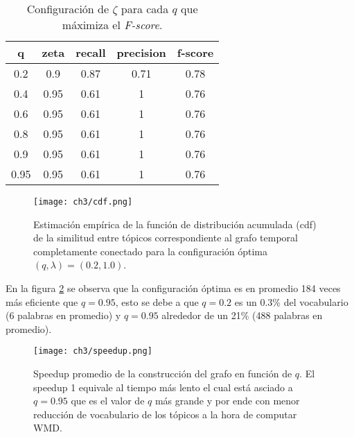 \documentclass[letterpaper,12pt,oneside]{book} %
\begin{document}
\begin{table}[H]
    \begin{tabular}{|c|c|c|c|c|}
    \hline
    \textbf{q} & \textbf{zeta} & \textbf{recall} & \textbf{precision} & \textbf{f-score} \\ \hline
    0.2        & 0.9           & 0.87            & 0.71               & 0.78             \\ \hline
    0.4        & 0.95          & 0.61            & 1                  & 0.76             \\ \hline
    0.6        & 0.95          & 0.61            & 1                  & 0.76             \\ \hline
    0.8        & 0.95          & 0.61            & 1                  & 0.76             \\ \hline
    0.9        & 0.95          & 0.61            & 1                  & 0.76             \\ \hline
    0.95       & 0.95          & 0.61            & 1                  & 0.76             \\ \hline
    \end{tabular}
    \caption{Configuración de $\zeta$ para cada $q$ que máximiza el \textit{F-score}.}
    \label{table:f_score}
\end{table}

\begin{figure}
    \centering
    \texttt{[image: ch3/cdf.png]}
    \caption{Estimación empírica de la función de distribución acumulada (cdf) de la similitud entre tópicos correspondiente al grafo temporal completamente conectado para la configuración óptima $(q, \lambda)=(0.2, 1.0)$.}
    \label{img:cdf}
\end{figure}

En la figura \ref{img:speedup} se observa que la configuración óptima es en promedio 184 veces más eficiente que $q=0.95$, esto se debe a que $q=0.2$ es un 0.3\% del vocabulario (6 palabras en promedio) y $q=0.95$ alrededor de un 21\% (488 palabras en promedio).


\begin{figure}
    \centering
    \texttt{[image: ch3/speedup.png]}
    \caption{Speedup promedio de la construcción del grafo en función de $q$. El speedup 1 equivale al tiempo más lento el cual está asciado a $q=0.95$ que es el valor de $q$ más grande y por ende con menor reducción de vocabulario de los tópicos a la hora de computar WMD.}
    \label{img:speedup}
\end{figure}
\end{document}
